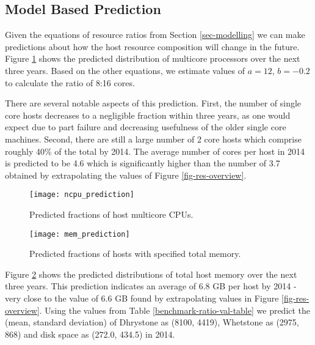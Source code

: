 \documentclass[conference]{IEEEtran}
\begin{document}
\subsection{Model Based Prediction}
Given the equations of resource ratios from Section \ref{sec-modelling} we can make predictions about how the host resource composition will change in the future.  Figure \ref{fig-ncpu-prediction} shows the predicted distribution of multicore processors over the next three years.  Based on the other equations, we estimate values of $a=12$, $b=-0.2$ to calculate the ratio of 8:16 cores.

There are several notable aspects of this prediction.  First, the number of single core hosts decreases to a negligible fraction within three years, as one would expect due to part failure and decreasing usefulness of the older single core machines.  Second, there are still a large number of 2 core hosts which comprise roughly 40\% of the total by 2014.  The average number of cores per host in 2014 is predicted to be 4.6 which is significantly higher than the number of 3.7 obtained by extrapolating the values of Figure \ref{fig-res-overview}.

\begin{figure}[!t]
\centering
\texttt{[image: ncpu\_prediction]}
\caption{Predicted fractions of host multicore CPUs.}
\label{fig-ncpu-prediction}
\end{figure}

\begin{figure}[!t]
\centering
\texttt{[image: mem\_prediction]}
\caption{Predicted fractions of hosts with specified total memory.}
\label{fig-mem-prediction}
\end{figure}

Figure \ref{fig-mem-prediction} shows the predicted distributions of total host memory over the next three years.  This prediction indicates an average of 6.8 GB per host by 2014 - very close to the value of 6.6 GB found by extrapolating values in Figure \ref{fig-res-overview}.  Using the values from Table \ref{benchmark-ratio-val-table} we predict the (mean, standard deviation) of Dhrystone as (8100, 4419), Whetstone as (2975, 868) and disk space as (272.0, 434.5) in 2014.

\end{document}
